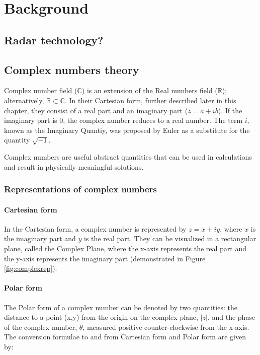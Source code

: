 \chapter{Background}\label{chap:comp}
\section{Radar technology?}


\section{Complex numbers theory}

Complex number field ($\mathbb{C}$) is an extension of the Real numbers field ($\mathbb{R}$); alternatively, $\mathbb{R}\subset\mathbb{C}$. In their Cartesian form, further described later in this chapter, they consist of a real part and an imaginary part ($z=a+ib$). If the imaginary part is $0$, the complex number reduces to a real number. The term $i$, known as the Imaginary Quantiy, was proposed by Euler as a substitute for the quantity $\sqrt{-1}$. 



Complex numbers are useful abstract quantities that can be used in calculations and result in physically meaningful solutions.



\subsection{Representations of complex numbers}

\subsubsection{Cartesian form}
In the Cartesian form, a complex number is represented by $z=x+iy$, where $x$ is the imaginary part and $y$ is the real part. They can be visualized in a rectangular plane, called the Complex Plane, where the x-axis represents the real part and the y-axis represents the imaginary part (demonstrated in Figure \ref{fig:complexrep}). 

\subsubsection{Polar form}
The Polar form of a complex number can be denoted by two quantities: 
the distance to a point (x,y) from the origin on the complex plane, $|z|$, and the phase of the complex number, $\theta$, measured positive counter-clockwise from the x-axis. The conversion formulae to and from Cartesian form and Polar form are given by:





